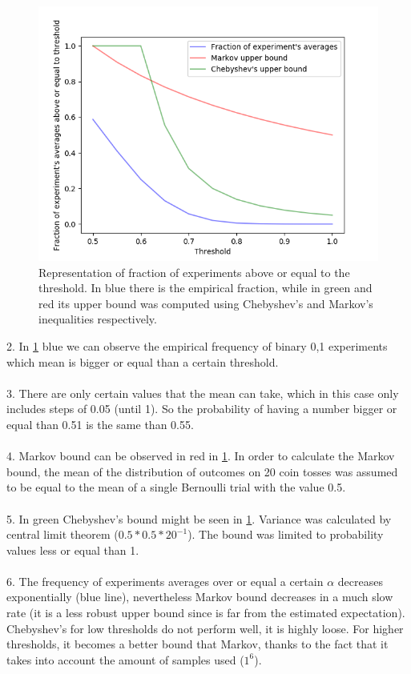 \documentclass[a4paper]{article}
\begin{document}
\begin{figure}[H]
  \centering
  \includegraphics[width=\textwidth]{code/markov_chebychev.png}
  \caption{Representation of fraction of experiments above or equal to the threshold. In blue there is the empirical fraction, while in green and red its upper bound was computed using Chebyshev's and Markov's inequalities respectively. }
  \label{fig:plot_bounds}
\end{figure}
2. In \ref{fig:plot_bounds} blue we can observe the empirical frequency of binary 0,1 experiments which mean is bigger or equal than a certain threshold.  \\\\
3. There are only certain values that the mean can take, which in this case only includes steps of 0.05 (until 1).
	So the probability of having a number bigger or equal than 0.51 is the same than 0.55.\\\\
4. Markov bound can be observed in red in  \ref{fig:plot_bounds}. In order to calculate the Markov bound, the mean of the distribution of outcomes on 20 coin tosses was assumed to be equal to the mean of a single Bernoulli trial with the value 0.5. \\\\
5. In green Chebyshev's bound might be seen in \ref{fig:plot_bounds}. Variance was calculated by central limit theorem ($0.5*0.5*20^{-1}$). The bound was limited to probability values less or equal than 1.\\\\
6. The frequency of experiments averages over or equal a certain $\alpha$ decreases exponentially (blue line), nevertheless Markov bound decreases in a much slow rate (it is a less robust upper bound since is far from the estimated expectation). Chebyshev's for low thresholds do not perform well, it is highly loose. For higher thresholds, it becomes a better bound that Markov, thanks to the fact that it takes into account the amount of samples used ($1^{6}$).\\\\
\end{document}
